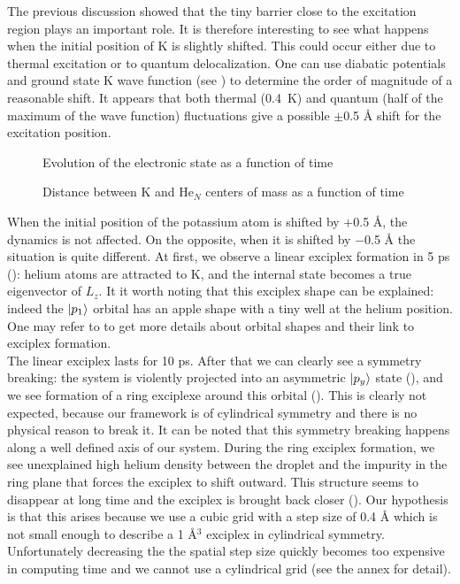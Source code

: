 The previous discussion showed that the tiny barrier close to the excitation region plays an important role. 
It is therefore interesting to see what happens when the initial position of K is slightly shifted.
This could occur either due to thermal excitation or to quantum delocalization.
One can use diabatic potentials and ground state K wave function (see ) to determine the order of magnitude of a reasonable shift.
It appears that both thermal (0.4~K) and quantum (half of the maximum of the wave function) fluctuations give a possible $\pm$0.5 \AA{} shift for the excitation position.
%
\begin{figure}[h!]
\centering
	\begin{minipage}[c]{0.48\linewidth}
		
		\vspace{0.2\baselineskip}
		\caption{Evolution of the electronic state as a function of time\label{fig:4P-p12-d-proj}}
	\end{minipage}
\hfill
	\begin{minipage}[c]{0.48\linewidth}
		
		\vspace{0.2\baselineskip}
		\caption{Distance between K and He$_N$ centers of mass as a function of time\label{fig:4P-p12-d-pos}}
	\end{minipage}
\end{figure}

When the initial position of the potassium atom is shifted by $+$0.5 \AA{}, the dynamics is not affected.
On the opposite, when it is shifted by $-$0.5 \AA{} the situation is quite different.
At first, we observe a linear exciplex formation in 5 ps (): helium atoms are attracted to K, and the internal state becomes a true eigenvector of $L_z$.
It it worth noting that this exciplex shape can be explained: indeed the $\ket{p_1}$ orbital has an apple shape with a tiny well at the helium position. 
One may refer to \cite{Zbi2005} to get more details about orbital shapes and their link to exciplex formation. \\

The linear exciplex lasts for 10 ps. 
After that we can clearly see a symmetry breaking: the system is violently projected into an asymmetric $\ket{p_y}$ state (), and we see formation of a ring exciplexe around this orbital (). 
This is clearly not expected, because our framework is of cylindrical symmetry and there is no physical reason to break it. 
It can be noted that this symmetry breaking happens along a well defined axis of our system. 
During the ring exciplex formation, we see  unexplained high helium density  between the droplet and the impurity in the ring plane that forces the exciplex to shift outward.  
This structure seems to disappear at long time and the exciplex is brought back closer (). 
Our hypothesis is that this arises because we use a cubic grid with a step size of 0.4 \AA{} which is not small enough to describe a 1 \AA{}$^3$ exciplex in cylindrical symmetry. 
Unfortunately decreasing the  the spatial step size quickly becomes too expensive in computing time and  we cannot use a cylindrical grid (see the annex for detail).

